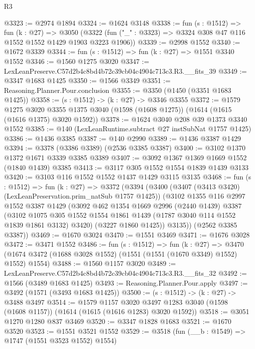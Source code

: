 \begin{lexlean}{R3}
\begin{coremodule}
@3323 := @2974 @1894
@3324 := @1624 @3148
@3338 := fun (s : @1512) =>
  fun (k : @27) =>
  @3050 (@3322 (fun ("_" : @3323) => @3324 @308 @47 @116 @1552 @1552 @1429 @1903 @3223 @1906))
@3339 := @2998 @1552
@3340 := @1672 @3339
@3344 := fun (s : @1512) => fun (k : @27) => @1551 @3340 @1552
@3346 := @1560 @1275 @3020
@3347 := LexLeanPreserve.C57d2b4c8bd4b72c39cb04c4904c713c3.R3.__fits_39
@3349 := @3347 @1683 @1425
@3350 := @1566 @3349
@3351 := Reasoning.Planner.Pour.conclusion
@3355 := @3350 (@1450 (@3351 @1683 @1425))
@3358 := (s : @1512) -> (k : @27) -> @3346 @3355
@3372 := @1579
    @1275
    @3020
    @3355
    @1375
    @3040
    (@1598 (@1608 @1275))
    (@1614 (@1615 (@1616 @1375) @3020 @1592))
@3378 := @1624 @3040 @208 @39 @1373 @3340 @1552
@3385 := @140 (LexLeanRuntime.subtract @27 instSubNat @1757 @1425)
@3386 := @1436 @3385
@3387 := @140 @2990
@3389 := @1436 @3387 @1429
@3394 := @3378 (@3386 @3389) (@2536 @3385 @3387)
@3400 := @3102 @1370 @1372 @1671 @3339 @3385 @3389
@3407 := @3092 @1367 @1369 @1669 @1552 (@1840 @1439) @3385
@3413 := @3117 @305 @1552 @1554 @1839 @1439 @3133
@3420 := @3103 @116 @1552 @1552 @1437 @1429 @3115 @3135
@3468 := fun (s : @1512) =>
  fun (k : @27) =>
  @3372
    (@3394
      (@3400
        (@3407 (@3413 @3420) (LexLeanPreservation.prim_natSub @1757 @1425))
        (@3102
          @1355
          @116
          @2997
          @1552
          @3387
          @1429
          (@3092
            @462
            @1354
            @1669
            @2996
            (@2440 @1439)
            @3387
            (@3102
              @1075
              @305
              @1552
              @1554
              @1861
              @1439
              (@1787 @3040 @114 @1552 @1839 @1861 @3132)
              @3420)
            (@3227 @1860 @1425))
          @3135))
      (@2562 @3385 @3387))
@3469 := @1670 @3024
@3470 := @1551 @3469
@3471 := @1676 @3028
@3472 := @3471 @1552
@3486 := fun (s : @1512) =>
  fun (k : @27) =>
  @3470 (@1674 @3472 (@1688 @3028 @1552) (@1551 (@1551 (@1670 @3349) @1552) @1552) @1554)
@3488 := @1560 @1157 @3020
@3489 := LexLeanPreserve.C57d2b4c8bd4b72c39cb04c4904c713c3.R3.__fits_32
@3492 := @1566 (@3489 @1683 @1425)
@3493 := Reasoning.Planner.Pour.apply
@3497 := @3492 (@1571 (@3493 @1683 @1425))
@3500 := (s : @1512) -> (k : @27) -> @3488 @3497
@3514 := @1579
    @1157
    @3020
    @3497
    @1283
    @3040
    (@1598 (@1608 @1157))
    (@1614 (@1615 (@1616 @1283) @3020 @1592))
@3518 := @3051 @1270 @1280 @837 @3469
@3520 := @3347 @1828 @1683
@3521 := @1670 @3520
@3523 := @1551 @3521 @1552
@3529 := @3518 (fun (__b : @1549) => @1747 (@1551 @3523 @1552) @1554)

\end{coremodule}
\end{lexlean}
